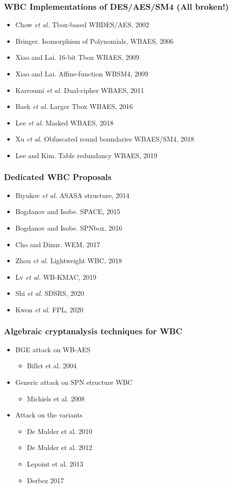 \documentclass{beamer}
\begin{document}
\frame
{
\frametitle{WBC Implementations of DES/AES/SM4 (All broken!)}
\begin{itemize}
\item Chow \textit{et al.} Tbox-based WBDES/AES, 2002
\item Bringer. Isomorphism of Polynomials, WBAES, 2006
\item Xiao and Lai. 16-bit Tbox WBAES, 2009
\item Xiao and Lai. Affine-function WBSM4, 2009
\item Karroumi \textit{et al.} Dual-cipher WBAES, 2011
\item Baek \textit{et al.} Larger Tbox WBAES, 2016
\item Lee \textit{et al.} Masked WBAES, 2018
\item Xu \textit{et al.} Obfuscated round boundaries WBAES/SM4, 2018
\item Lee and Kim. Table redundancy WBAES, 2019
\end{itemize}
}

\frame
{
\frametitle{Dedicated WBC Proposals}
\begin{itemize}
\item Biyukov \textit{et al.} ASASA structure, 2014
\item Bogdanov and Isobe. SPACE, 2015
\item Bogdanov and Isobe. SPNbox, 2016
\item Cho and Dinur. WEM, 2017
\item Zhou \textit{et al.} Lightweight WBC, 2018
\item Lv \textit{et al.} WB-KMAC, 2019
\item Shi \textit{et al.} SDSRS, 2020 
\item Kwon \textit{et al.} FPL, 2020
\end{itemize}
}

\frame
{
\frametitle{Algebraic cryptanalysis techniques for WBC}
\begin{itemize}
\item BGE attack on WB-AES
\begin{itemize}
\item Billet et al. 2004
\end{itemize}

\item Generic attack on SPN structure WBC
\begin{itemize}
\item Michiels et al. 2008
\end{itemize}

\item Attack on the variants
\begin{itemize}
\item De Mulder et al. 2010
\item De Mulder et al. 2012
\item Lepoint et al. 2013
\item Derbez 2017
\end{itemize}
\end{itemize}
}
\end{document}

